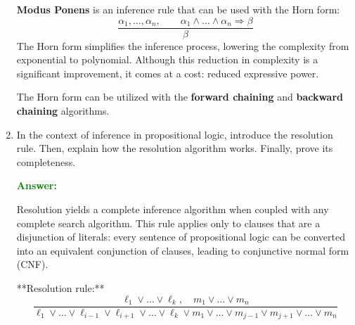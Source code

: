 \documentclass[12pt]{article}
\begin{document}
\begin{enumerate}[label=\textbf{PL.\arabic*}]
          \textbf{Modus Ponens} is an inference rule that can be used with the Horn form:
          \begin{equation}
              \frac{\alpha_1,\ldots,\alpha_n,\qquad \alpha_1\land\ldots\land\alpha_n\Rightarrow\beta}{\beta}
          \end{equation}
          The Horn form simplifies the inference process, lowering the complexity from exponential to polynomial.
          Although this reduction in complexity is a significant improvement, it comes at a cost: reduced expressive power.

          The Horn form can be utilized with the \textbf{forward chaining} and \textbf{backward chaining} algorithms.

    \item In the context of inference in propositional logic, introduce the resolution rule.
          Then, explain how the resolution algorithm works.
          Finally, prove its completeness.

          \textcolor{green}{\textbf{Answer:}}

          Resolution yields a complete inference algorithm when coupled with any complete search algorithm. This rule applies only to clauses that are a disjunction of literals: every sentence of propositional logic can be converted into an equivalent conjunction of clauses, leading to conjunctive normal form (CNF).

          **Resolution rule:**
          \begin{equation}
              \frac{\ell_1 \lor \ldots \lor \ell_k, \quad m_1 \lor \ldots \lor m_n}{\ell_1 \lor \ldots \lor \ell_{i-1} \lor \ell_{i+1} \lor \ldots \lor \ell_k \lor m_1 \lor \ldots \lor m_{j-1} \lor m_{j+1} \lor \ldots \lor m_n}
          \end{equation}


\end{enumerate}
\end{document}
